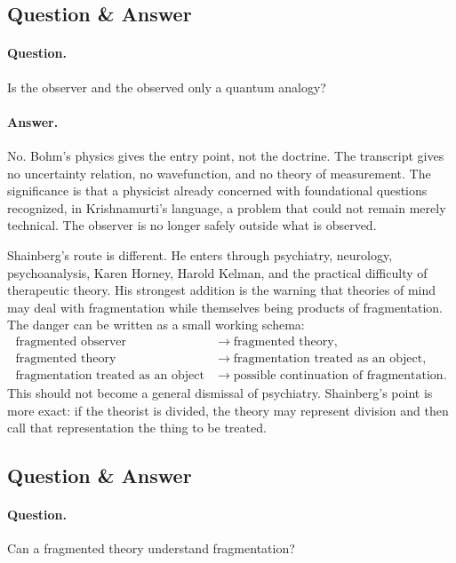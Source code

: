 \documentclass[11pt,oneside]{book}
\begin{document}
\subsection{Question \& Answer}

\paragraph{Question.}
Is the observer and the observed only a quantum analogy?

\paragraph{Answer.}
No. Bohm's physics gives the entry point, not the doctrine. The transcript gives no uncertainty relation, no wavefunction, and no theory of measurement. The significance is that a physicist already concerned with foundational questions recognized, in Krishnamurti's language, a problem that could not remain merely technical. The observer is no longer safely outside what is observed.

Shainberg's route is different. He enters through psychiatry, neurology, psychoanalysis, Karen Horney, Harold Kelman, and the practical difficulty of therapeutic theory. His strongest addition is the warning that theories of mind may deal with fragmentation while themselves being products of fragmentation. The danger can be written as a small working schema:
\begin{align}
\text{fragmented observer}
&\longrightarrow
\text{fragmented theory},\\
\text{fragmented theory}
&\longrightarrow
\text{fragmentation treated as an object},\\
\text{fragmentation treated as an object}
&\longrightarrow
\text{possible continuation of fragmentation}.
\end{align}
This should not become a general dismissal of psychiatry. Shainberg's point is more exact: if the theorist is divided, the theory may represent division and then call that representation the thing to be treated.

\subsection{Question \& Answer}

\paragraph{Question.}
Can a fragmented theory understand fragmentation?
\end{document}
